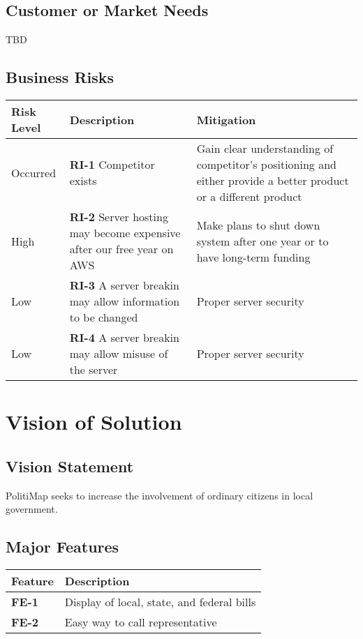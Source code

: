\documentclass{article}
\begin{document}
\subsection{Customer or Market Needs}
TBD

\subsection{Business Risks}
\begin{tabu}{lXX}
  \toprule
  Risk Level & Description & Mitigation \\
  \midrule
  Occurred &
  \textbf{RI-1} Competitor exists &
  Gain clear
  understanding of competitor's positioning and either provide a
  better product or a different product\\

  High &
  \textbf{RI-2} Server hosting may become expensive after our
  free year on AWS &
  Make plans to shut down system after one year or to
  have long-term funding \\

  Low &
  \textbf{RI-3} A server breakin may allow information to be
  changed &
  Proper server security \\
  Low & \textbf{RI-4} A server breakin may allow misuse of the server
& Proper server security \\
  \bottomrule
\end{tabu}

\section{Vision of Solution}
\subsection{Vision Statement}
PolitiMap seeks to increase the involvement of ordinary citizens in
local government.

\subsection{Major Features}
\begin{tabu}{lX}
  \toprule
  Feature & Description\\
  \midrule
  \textbf{FE-1} & Display of local, state, and federal bills\\
  \textbf{FE-2} & Easy way to call representative\\
  \bottomrule
\end{tabu}
\end{document}

